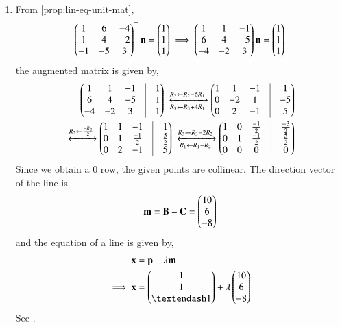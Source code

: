 \begin{enumerate}
	\item From 
		\eqref{prop:lin-eq-unit-mat},
\begin{align}
\begin{pmatrix}1&6&-4\\1&4&-2\\-1&-5&3\end{pmatrix}^\top \mathbf{n}=\begin{pmatrix}1\\1\\1\end{pmatrix}
\implies \begin{pmatrix}1&1&-1\\ 6&4&-5\\ -4&-2&3\end{pmatrix} \mathbf{n} = \begin{pmatrix}1\\1\\1\end{pmatrix}
\end{align}
the augmented matrix is given by,
\begin{align}
\myvec{1&1&-1&\vrule&1\\6&4&-5&\vrule&1\\-4&-2&3&\vrule&1}
\xleftrightarrow[R_3 \leftarrow R_3 + 4R_1]{R_2 \leftarrow R_2 - 6R_1}
\myvec{1&1&-1&\vrule&1\\0&-2&1&\vrule&-5\\0&2&-1&\vrule&5}\\ 
\xleftrightarrow{R_2 \leftarrow \frac{-R_2}{2}} 
\myvec{1&1&-1&\vrule&1\\0&1&\frac{-1}{2}&\vrule&\frac{5}{2}\\0&2&-1&\vrule&5}
\xleftrightarrow[{R_1 \leftarrow R_1 - R_2}] {R_3 \leftarrow R_3 - 2R_2}
\myvec{1&0&\frac{-1}{2}&\vrule&\frac{-3}{2}\\0&1&\frac{-1}{2}&\vrule&\frac{5}{2}\\0&0&0&\vrule&0}
\end{align}
Since we obtain a 0 row, 
the given points are collinear.
The direction vector of the line is
\begin{align}
\mathbf{m}=\mathbf{B}-\mathbf{C} = \begin{pmatrix}10\\6\\-8\end{pmatrix}
\end{align}
and the equation of a line is given by,
\begin{align}
	\vec{x}&=\vec{p}+  \lambda \vec{m}\\
	\implies \vec{x}&= \myvec{1\\1\\– 1} + \lambda \myvec{10\\6\\-8}
\end{align}
See 
     .
\begin{figure}[h!]
  \centering

\end{figure}
\end{enumerate}
